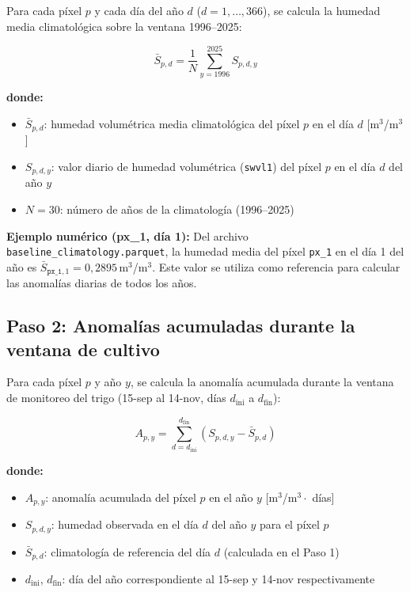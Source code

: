 \documentclass[11pt,a4paper]{article}
\begin{document}
Para cada píxel $p$ y cada día del año $d$ ($d = 1, \ldots, 366$), se calcula la humedad media climatológica sobre la ventana 1996--2025:

\begin{equation}
  \bar{S}_{p,d} = \frac{1}{N} \sum_{y=1996}^{2025} S_{p,d,y}
\end{equation}

\textbf{donde:}
\begin{itemize}
  \item $\bar{S}_{p,d}$: humedad volumétrica media climatológica del píxel $p$ en el día $d$ [m$^3$/m$^3$]
  \item $S_{p,d,y}$: valor diario de humedad volumétrica (\texttt{swvl1}) del píxel $p$ en el día $d$ del año $y$
  \item $N = 30$: número de años de la climatología (1996--2025)
\end{itemize}

\textbf{Ejemplo numérico (px\_1, día 1):}
Del archivo \texttt{baseline\_climatology.parquet}, la humedad media del píxel \texttt{px\_1} en el día 1 del año es $\bar{S}_{\texttt{px\_1},1} = 0{,}2895$\,m$^3$/m$^3$. Este valor se utiliza como referencia para calcular las anomalías diarias de todos los años.

\subsection{Paso 2: Anomalías acumuladas durante la ventana de cultivo}
\label{sec:anomalias}

Para cada píxel $p$ y año $y$, se calcula la anomalía acumulada durante la ventana de monitoreo del trigo (15-sep al 14-nov, días $d_{\text{ini}}$ a $d_{\text{fin}}$):

\begin{equation}
  A_{p,y} = \sum_{d=d_{\text{ini}}}^{d_{\text{fin}}} \left( S_{p,d,y} - \bar{S}_{p,d} \right)
\end{equation}

\textbf{donde:}
\begin{itemize}
  \item $A_{p,y}$: anomalía acumulada del píxel $p$ en el año $y$ [m$^3$/m$^3 \cdot$ días]
  \item $S_{p,d,y}$: humedad observada en el día $d$ del año $y$ para el píxel $p$
  \item $\bar{S}_{p,d}$: climatología de referencia del día $d$ (calculada en el Paso 1)
  \item $d_{\text{ini}}$, $d_{\text{fin}}$: día del año correspondiente al 15-sep y 14-nov respectivamente
\end{itemize}
\end{document}
